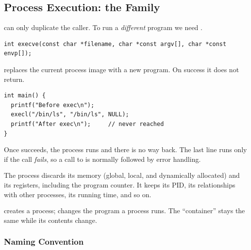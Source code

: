 \subsection{Process Execution: the \texorpdfstring{}{exec*()} Family}

 can only duplicate the caller. To run a \emph{different} program we need .

\begin{definition}
\begin{lstlisting}
int execve(const char *filename, char *const argv[], char *const envp[]);
\end{lstlisting}
   replaces the current process image with a new program. On success it does not return.
\end{definition}

\begin{example}
\begin{lstlisting}
int main() {
  printf("Before exec\n");
  execl("/bin/ls", "/bin/ls", NULL);
  printf("After exec\n");     // never reached
}
\end{lstlisting}
  Once  succeeds, the process runs  and there is no way back. The last line runs only if the call \emph{fails}, so a call to  is normally followed by error handling.
\end{example}

The process discards its memory (global, local, and dynamically allocated) and its registers, including the program counter. It keeps its PID, its relationships with other processes, its running time, and so on.

\begin{keypoint}
   creates a process;  changes the program a process runs. The ``container'' stays the same while its contents change.
\end{keypoint}

\subsubsection{Naming Convention}


